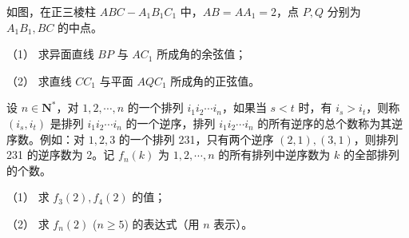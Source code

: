 \begin{question}
如图，在正三棱柱 $ABC - A_1B_1C_1$ 中，$AB = AA_1 = 2$，点 $P, Q$ 分别为 $A_1B_1, BC$ 的中点。

（1） 求异面直线 $BP$ 与 $AC_1$ 所成角的余弦值；

（2） 求直线 $CC_1$ 与平面 $AQC_1$ 所成角的正弦值。
\nopagebreak[4]
\begin{center}\end{center}
\nopagebreak[4]
\end{question}
\begin{question}
设 $n \in \mathbf{N}^*$，对 $1, 2, \cdots, n$ 的一个排列 $i_1 i_2 \cdots i_n$，如果当 $s < t$ 时，有 $i_s > i_t$，则称 $(i_s, i_t)$ 是排列 $i_1 i_2 \cdots i_n$ 的一个逆序，排列 $i_1 i_2 \cdots i_n$ 的所有逆序的总个数称为其逆序数。例如：对 $1, 2, 3$ 的一个排列 231，只有两个逆序 $(2, 1), (3, 1)$，则排列 231 的逆序数为 2。记 $f_n(k)$ 为 $1, 2, \cdots, n$ 的所有排列中逆序数为 $k$ 的全部排列的个数。

（1） 求 $f_3(2), f_4(2)$ 的值；

（2） 求 $f_n(2)$ ($n \geqslant 5$) 的表达式（用 $n$ 表示）。

\end{question}